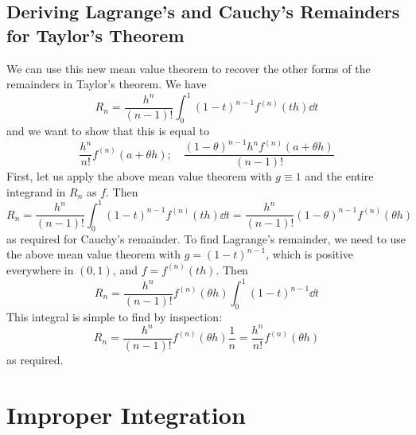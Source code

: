 \documentclass{article}
\begin{document}
\subsection{Deriving Lagrange's and Cauchy's Remainders for Taylor's Theorem}
We can use this new mean value theorem to recover the other forms of the remainders in Taylor's theorem. We have
\[ R_n = \frac{h^n}{(n-1)!} \int_0^1 (1-t)^{n-1}f^{(n)}(th) \dd{t} \]
and we want to show that this is equal to
\[ \frac{h^n}{n!}f^{(n)}(a + \theta h);\quad \frac{(1 - \theta)^{n-1}h^nf^{(n)}(a + \theta h)}{(n-1)!} \]
First, let us apply the above mean value theorem with $g \equiv 1$ and the entire integrand in $R_n$ as $f$. Then
\[ R_n = \frac{h^n}{(n-1)!} \int_0^1 (1-t)^{n-1}f^{(n)}(th) \dd{t} = \frac{h^n}{(n-1)!} (1-\theta)^{n-1}f^{(n)}(\theta h) \]
as required for Cauchy's remainder. To find Lagrange's remainder, we need to use the above mean value theorem with $g = (1-t)^{n-1}$, which is positive everywhere in $(0, 1)$, and $f = f^{(n)}(th)$. Then
\[ R_n = \frac{h^n}{(n-1)!} f^{(n)}(\theta h) \int_0^1 (1-t)^{n-1}\dd{t} \]
This integral is simple to find by inspection:
\[ R_n = \frac{h^n}{(n-1)!} f^{(n)}(\theta h) \frac{1}{n} = \frac{h^n}{n!} f^{(n)}(\theta h) \]
as required.

\section{Improper Integration}
\end{document}
